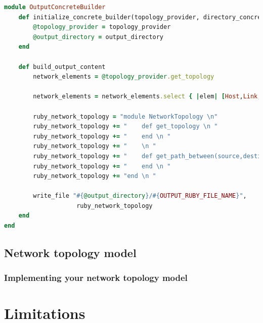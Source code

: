 \begin{lstlisting}[language=Ruby,breaklines=true]
module OutputConcreteBuilder
	def initialize_concrete_builder(topology_provider, directory_concrete_builders, output_directory)
		@topology_provider = topology_provider
		@output_directory = output_directory
	end
    
    def build_output_content
		network_elements = @topology_provider.get_topology
        
        network_elements = network_elements.select { |elem| [Host,Link,Router].include? elem.class }    
    
    	ruby_network_topology = "module NetworkTopology \n"
    	ruby_network_topology += "    def get_topology \n "
    	ruby_network_topology += "    end \n "
    	ruby_network_topology += "    \n "
    	ruby_network_topology += "    def get_path_between(source,destination) \n "
    	ruby_network_topology += "    end \n "
    	ruby_network_topology += "end \n "
    	
    	write_file "#{@output_directory}/#{OUTPUT_RUBY_FILE_NAME}",
                    ruby_network_topology
    end
end
\end{lstlisting}

\subsection{Network topology model}

\subsubsection{Implementing your network topology model}



\section{Limitations}